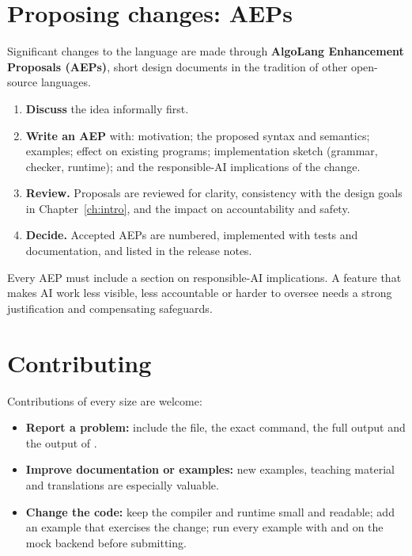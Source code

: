 \section{Proposing changes: AEPs}

Significant changes to the language are made through \textbf{AlgoLang Enhancement Proposals (AEPs)}, short design documents in the tradition of other open-source languages.

\begin{enumerate}
  \item \textbf{Discuss} the idea informally first.
  \item \textbf{Write an AEP} with: motivation; the proposed syntax and semantics; examples; effect on existing programs; implementation sketch (grammar, checker, runtime); and the responsible-AI implications of the change.
  \item \textbf{Review.} Proposals are reviewed for clarity, consistency with the design goals in Chapter~\ref{ch:intro}, and the impact on accountability and safety.
  \item \textbf{Decide.} Accepted AEPs are numbered, implemented with tests and documentation, and listed in the release notes.
\end{enumerate}

\begin{ethics}
Every AEP must include a section on responsible-AI implications. A feature that makes AI work less visible, less accountable or harder to oversee needs a strong justification and compensating safeguards.
\end{ethics}

\section{Contributing}

Contributions of every size are welcome:

\begin{itemize}
  \item \textbf{Report a problem:} include the  file, the exact command, the full output and the output of .
  \item \textbf{Improve documentation or examples:} new examples, teaching material and translations are especially valuable.
  \item \textbf{Change the code:} keep the compiler and runtime small and readable; add an example that exercises the change; run every example with  and  on the mock backend before submitting.
\end{itemize}

